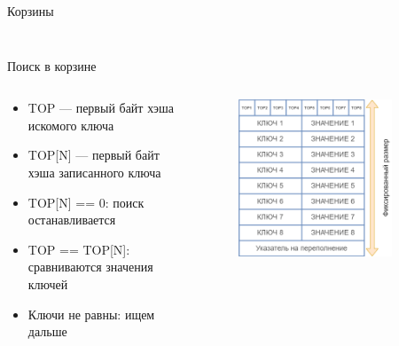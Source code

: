 \documentclass[aspectratio=169]{beamer}
\begin{document}
\begin{frame}{Корзины}
\begin{columns}[t,onlytextwidth]
\begin{column}{0.48\textwidth}
\begin{figure}
                        \end{figure}
                \end{column}
        \end{columns}
\end{frame}

\begin{frame}{Поиск в корзине}
        \begin{columns}[t,onlytextwidth]
                \begin{column}{0.50\textwidth}
                        \begin{itemize}
                                \item TOP --- первый байт хэша искомого ключа
                                \item TOP[N] --- первый байт хэша записанного ключа
                                \item TOP[N] == 0: поиск останавливается
                                \item TOP == TOP[N]: сравниваются значения ключей
                                \item Ключи не равны: ищем дальше
                        \end{itemize}
                \end{column}
                \begin{column}{0.48\textwidth}
                        \begin{figure}
                                \includegraphics[width=0.85\textwidth]{img/bucketsize.png} \\
                        \end{figure}
                \end{column}
        \end{columns}
\end{frame}
\end{document}
